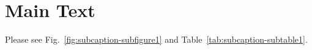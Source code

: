 \section{Main Text}
\label{sec:main}





Please see Fig.~\ref{fig:subcaption-subfigure1} and Table~\ref{tab:subcaption-subtable1}.
